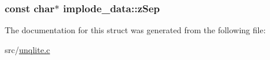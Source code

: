 \hypertarget{structimplode__data_af9bb28c0606b1d8f6cc82df2104b3af6}{
\subsubsection[{z\-Sep}]{\setlength{\rightskip}{0pt plus 5cm}const char$\ast$ implode\-\_\-data\-::z\-Sep}}\label{d7/d2e/structimplode__data_af9bb28c0606b1d8f6cc82df2104b3af6}


The documentation for this struct was generated from the following file\-:\begin{DoxyCompactItemize}
\item 
src/\hyperlink{unqlite_8c}{unqlite.\-c}\end{DoxyCompactItemize}
